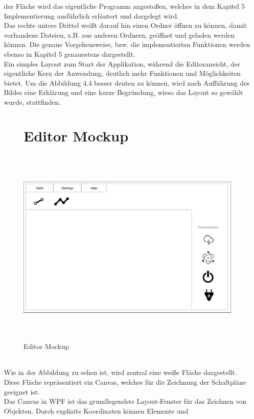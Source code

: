 der Fläche wird das eigentliche Programm angestoßen, welches in dem Kapitel 5 Implementierung ausführlich erläutert und dargelegt wird.
\\
\linebreak
Das rechte untere Drittel weißt darauf hin einen Ordner öffnen zu können, damit vorhandene Dateien, 
z.B. aus anderen Ordnern, geöffnet und geladen werden können. Die genaue Vorgehensweise, bzw. die implementierten Funktionen
werden ebenso in Kapitel 5 genauestens dargestellt. 
\pagebreak
\\Ein simples Layout zum Start der Applikation, während die Editoransicht, der eigentliche Kern der Anwendung, deutlich 
mehr Funktionen und Möglichkeiten bietet.
Um die Abbildung 4.4 besser deuten zu können, wird nach Aufführung des Bildes eine Erklärung und eine kurze Begründung, wieso 
das Layout so gewählt wurde, stattfinden.
\\
\begin{figure}[htb]
   \section*{Editor Mockup}
   \centering
  \includegraphics[width=15cm,height=10cm,keepaspectratio]{4Systementwurf/Bilder/EditorViewMockUp.png}
 \caption{Editor Mockup}
\end{figure} %
\\Wie in der Abbildung zu sehen ist, wird zentral eine weiße Fläche dargestellt. Diese Fläche repräsentiert ein Canvas, welches für die
Zeichnung der Schaltpläne geeignet ist. 
\\Das Canvas in WPF ist das grundlegendste Layout-Fenster für das Zeichnen von Objekten. Durch explizite Koordinaten können Elemente und 
